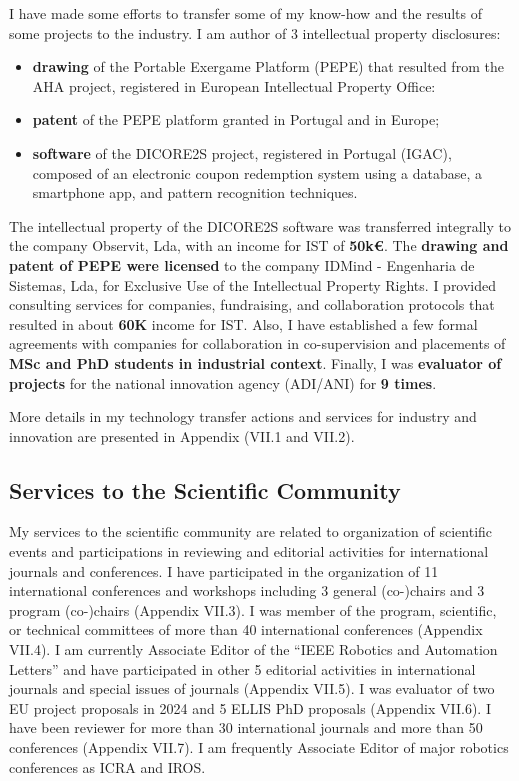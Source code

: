 \documentclass[
]{article}
\begin{document}
I have made some efforts to transfer some of my know-how and the results
of some projects to the industry. I am author of 3 intellectual property
disclosures:

\begin{itemize}
\item
  \textbf{drawing} of the Portable Exergame Platform (PEPE) that
  resulted from the AHA project, registered in European Intellectual
  Property Office:
\item
  \textbf{patent} of the PEPE platform granted in Portugal and in
  Europe;
\item
  \textbf{software} of the DICORE2S project, registered in Portugal
  (IGAC), composed of an electronic coupon redemption system using a
  database, a smartphone app, and pattern recognition techniques.
\end{itemize}

The intellectual property of the DICORE2S software was transferred
integrally to the company Observit, Lda, with an income for IST of
\textbf{50k€}. The \textbf{drawing and patent of PEPE were licensed} to
the company IDMind - Engenharia de Sistemas, Lda, for Exclusive Use of
the Intellectual Property Rights. I provided consulting services for
companies, fundraising, and collaboration protocols that resulted in
about \textbf{60K} income for IST. Also, I have established a few formal
agreements with companies for collaboration in co-supervision and
placements of \textbf{MSc and PhD students in industrial context}.
Finally, I was \textbf{evaluator of projects} for the national
innovation agency (ADI/ANI) for \textbf{9 times}.

More details in my technology transfer actions and services for industry
and innovation are presented in Appendix (VII.1 and VII.2).

\subsection{Services to the Scientific
Community}\label{services-to-the-scientific-community}

My services to the scientific community are related to organization of
scientific events and participations in reviewing and editorial
activities for international journals and conferences. I have
participated in the organization of 11 international conferences and
workshops including 3 general (co-)chairs and 3 program (co-)chairs
(Appendix VII.3). I was member of the program, scientific, or technical
committees of more than 40 international conferences (Appendix VII.4). I
am currently Associate Editor of the ``IEEE Robotics and Automation
Letters'' and have participated in other 5 editorial activities in
international journals and special issues of journals (Appendix VII.5).
I was evaluator of two EU project proposals in 2024 and 5 ELLIS PhD
proposals (Appendix VII.6). I have been reviewer for more than 30
international journals and more than 50 conferences (Appendix VII.7). I
am frequently Associate Editor of major robotics conferences as ICRA and
IROS.
\end{document}
